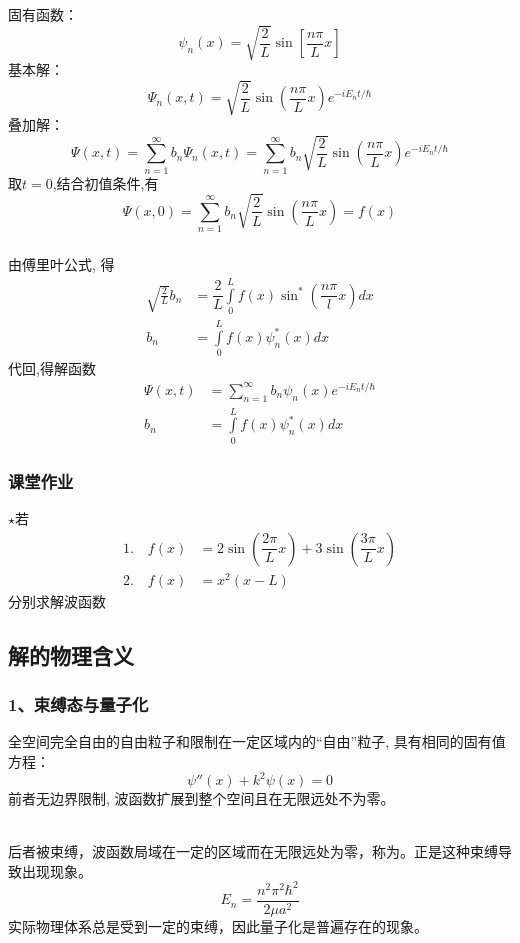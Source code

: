 \begin{frame}
  \frametitle{}
  固有函数：
  \[ \psi_n(x)=
		  \sqrt{\dfrac{2}{L}} \sin[\dfrac{n\pi}{L}x ]
	  \]
基本解：
$$ \Psi_n(x,t) = \sqrt{\frac{2}{L}}\sin(\dfrac{n\pi}{L}x) e^{-i E_n t/\hbar} $$ 
叠加解：
$$ \Psi(x,t) =\sum_{n=1} ^{\infty} b_n \Psi_n(x,t) = \sum_{n=1} ^{\infty} b_n \sqrt{\frac{2}{L}}\sin(\dfrac{n\pi}{L}x) e^{-i E_n t/\hbar} $$ 
取$t=0$,结合初值条件,有
$$ \Psi(x,0) = \sum_{n=1} ^{\infty} b_n \sqrt{\frac{2}{L}} \sin(\dfrac{n\pi}{L}x) = f(x) $$ 
\end{frame}

\begin{frame}
  \frametitle{}
  由傅里叶公式, 得
  \[
  \begin{aligned}
    \sqrt{\frac{2}{L}} b_n & = \dfrac{2}{L} \int\limits_{0} ^{L} f(x) \sin^* (\dfrac{n\pi}{l}x) dx \\
	b_n  &=  \int\limits_{0} ^{L} f(x) \psi^*_n(x) dx
  \end{aligned}
  \]
  代回,得解函数
$$ 
\boxed{\begin{aligned}
	\Psi(x,t) & = \sum_{n=1} ^{\infty} b_n \psi_n(x) e^{-i E_n t/\hbar} \\
	b_n & = \int\limits_{0} ^{L} f(x) \psi ^*_n(x) dx  
\end{aligned}}
 $$	
\end{frame} 

\begin{frame}
	\frametitle{课堂作业}
	$\star$若 $$ \begin{aligned}
		1. \quad f(x) & = 2\sin(\dfrac{2\pi}{L}x) + 3\sin(\dfrac{3\pi}{L}x) \\
		2. \quad  f(x) & = x^2(x-L) 
	  \end{aligned}
	  $$ 分别求解波函数
\end{frame}

\subsection{解的物理含义}

\begin{frame}
  \frametitle{ 1、束缚态与量子化}

\分 全空间完全自由的自由粒子和限制在一定区域内的“自由”粒子, 具有相同的固有值方程：
$$
\psi''(x) + k^2	\psi(x)=0  
$$  
前者无边界限制, 波函数扩展到整个空间且在无限远处不为零。

~~\\ 
后者被束缚，波函数局域在一定的区域而在无限远处为零，称为\emf[束缚态]。正是这种束缚导致出现\emf[量子化]现象。
\[E_n = \dfrac{n^2\pi^2\hbar^2}{2\mu a^2} \]
实际物理体系总是受到一定的束缚，因此量子化是普遍存在的现象。
\end{frame}

